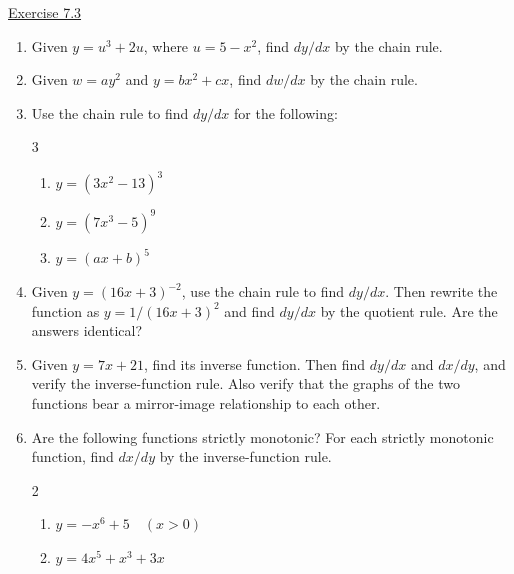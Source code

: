 \underline{Exercise 7.3}
\begin{enumerate}
\item[1.] Given $y=u^{3}+2 u$, where $u=5-x^{2}$, find $d y / d x$ by the chain rule.

\item[2.] Given $w=a y^{2}$ and $y=b x^{2}+c x$, find $d w / d x$ by the chain rule.

\item[3.] Use the chain rule to find $d y / d x$ for the following:
\begin{multicols}{3}
\begin{enumerate}
\item[(a)] $y=\left(3 x^{2}-13\right)^{3}$
\item[(b)] $y=\left(7 x^{3}-5\right)^{9}$
\item[(c)] $y=(a x+b)^{5}$
\end{enumerate}
\end{multicols}

\item[4.] Given $y=(16 x+3)^{-2}$, use the chain rule to find $d y / d x$. Then rewrite the function as $y=1 /(16 x+3)^{2}$ and find $d y / d x$ by the quotient rule. Are the answers identical?

\item[5.] Given $y=7 x+21$, find its inverse function. Then find $d y / d x$ and $d x / d y$, and verify the inverse-function rule. Also verify that the graphs of the two functions bear a mirror-image relationship to each other.

\item[6.] Are the following functions strictly monotonic? For each strictly monotonic function, find $d x / d y$ by the inverse-function rule.
\begin{multicols}{2}
\begin{enumerate}
\item[(a)] $y=-x^{6}+5 \quad(x>0)$
\item[(b)] $y=4 x^{5}+x^{3}+3 x$
\end{enumerate}
\end{multicols}
\end{enumerate}
